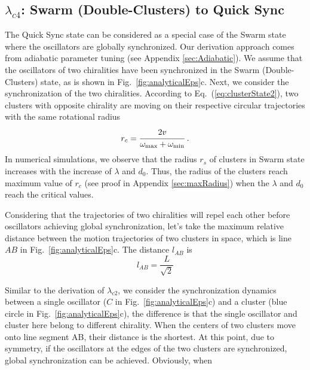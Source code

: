 \documentclass[%
 aip,
 amsmath,amssymb,
 reprint,%
]{revtex4-1}
\begin{document}
\subsection{$\lambda_{c4}$: Swarm (Double-Clusters) to Quick Sync}

The Quick Sync state can be considered as a special case of the Swarm state where the oscillators are globally synchronized. Our derivation approach comes from adiabatic parameter tuning (see Appendix \ref{sec:Adiabatic}). We assume that the oscillators of two chiralities have been synchronized in the Swarm (Double-Clusters) state, as is shown in Fig.~\ref{fig:analyticalEps}c. Next, we consider the synchronization of the two chiralities. According to Eq.~(\ref{eq:clusterState2}), two clusters with opposite chirality are moving on their respective circular trajectories with the same rotational radius
\begin{equation}
    r_c = \cfrac{2v}{\omega_{\max}+\omega_{\min}}\;.
\end{equation}
In numerical simulations, we observe that the radius $r_s$ of clusters in Swarm state increases with the increase of $\lambda$ and $d_0$. Thus, the radius of the clusters reach maximum value of $r_c$ (see proof in Appendix \ref{sec:maxRadius}) when the $\lambda$ and $d_0$ reach the critical values.

Considering that the trajectories of two chiralities will repel each other before oscillators achieving global synchronization, let's take the maximum relative distance between the motion trajectories of two clusters in space, which is line $AB$ in Fig.~\ref{fig:analyticalEps}c. The distance $l_{AB}$ is
\begin{equation}
    l_{AB}=\frac{L}{\sqrt{2}}
\end{equation}

Similar to the derivation of $\lambda_{c2}$, we consider the synchronization dynamics between a single oscillator ($C$ in Fig.~\ref{fig:analyticalEps}c) and a cluster (blue circle in Fig.~\ref{fig:analyticalEps}c), the difference is that the single oscillator and cluster here belong to different chirality. When the centers of two clusters move onto line segment AB, their distance is the shortest. At this point, due to symmetry, if the oscillators at the edges of the two clusters are synchronized, global synchronization can be achieved. Obviously, when 
\end{document}
